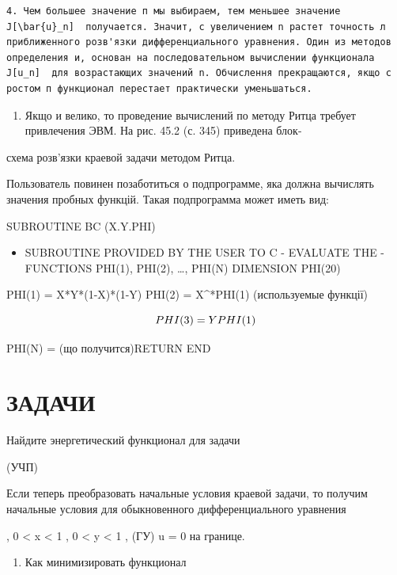 \documentclass[
  ukrainian,
]{article}
\providecommand{\tightlist}{%
  \setlength{\itemsep}{0pt}\setlength{\parskip}{0pt}}
\begin{document}
\begin{verbatim}
4. Чем большее значение п мы выбираем, тем меньшее значение  J[\bar{u}_n]  получается. Значит, с увеличением n растет точность л приближенного розв'язки дифференциального уравнения. Один из методов определения и, основан на последовательном вычислении функционала  J[u_n]  для возрастающих значений n. Обчислення прекращаются, якщо с ростом п функционал перестает практически уменьшаться.
\end{verbatim}

\begin{enumerate}
\def\labelenumi{\arabic{enumi}.}
\setcounter{enumi}{4}
\tightlist
\item
  Якщо и велико, то проведение вычислений по методу Ритца требует
  привлечения ЭВМ. На рис. 45.2 (с. 345) приведена блок-
\end{enumerate}

схема розв'язки краевой задачи методом Ритца.

Пользователь повинен позаботиться о подпрограмме, яка должна вычислять
значения пробных функцій. Такая подпрограмма может иметь вид:

SUBROUTINE BC (X.Y.PHI)

\begin{itemize}
\tightlist
\item
  SUBROUTINE PROVIDED BY THE USER TO C - EVALUATE THE - FUNCTIONS
  PHI(1), PHI(2), \ldots, PHI(N) DIMENSION PHI(20)
\end{itemize}

PHI(1) = X*Y*(1-X)*(1-Y) PHI(2) = X\^{}*PHI(1) (используемые функції)

\[
PHI(3) = Y\*PHI(1)
\]

PHI(N) = (що получится)RETURN END

\section{\texorpdfstring{\textbf{ЗА}ДАЧИ}{ЗАДАЧИ}}\label{ux437ux430ux434ux430ux447ux438-12}

Найдите энергетический функционал для задачи

(УЧП)

Если теперь преобразовать начальные условия краевой задачи, то получим
начальные условия для обыкновенного дифференциального уравнения

, 0 \textless{} x \textless{} 1 , 0 \textless{} y \textless{} 1 , (ГУ) u
= 0 на границе.

\begin{enumerate}
\def\labelenumi{\arabic{enumi}.}
\setcounter{enumi}{1}
\tightlist
\item
  Как минимизировать функционал
\end{enumerate}
\end{document}
